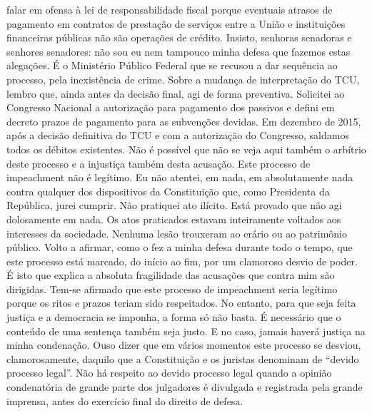 falar em ofensa à lei de responsabilidade fiscal porque eventuais
atrasos de pagamento em contratos de prestação de serviços entre a União
e instituições financeiras públicas não são operações de crédito.
Insisto, senhoras senadoras e senhores senadores: não sou eu nem
tampouco minha defesa que fazemos estas alegações. É o Ministério
Público Federal que se recusou a dar sequência ao processo, pela
inexistência de crime. Sobre a mudança de interpretação do TCU, lembro
que, ainda antes da decisão final, agi de forma preventiva. Solicitei ao
Congresso Nacional a autorização para pagamento dos passivos e defini em
decreto prazos de pagamento para as subvenções devidas. Em dezembro de
2015, após a decisão definitiva do TCU e com a autorização do Congresso,
saldamos todos os débitos existentes. Não é possível que não se veja
aqui também o arbítrio deste processo e a injustiça também desta
acusação. Este processo de impeachment não é legítimo. Eu não atentei,
em nada, em absolutamente nada contra qualquer dos dispositivos da
Constituição que, como Presidenta da República, jurei cumprir. Não
pratiquei ato ilícito. Está provado que não agi dolosamente em nada. Os
atos praticados estavam inteiramente voltados aos interesses da
sociedade. Nenhuma lesão trouxeram ao erário ou ao patrimônio público.
Volto a afirmar, como o fez a minha defesa durante todo o tempo, que
este processo está marcado, do início ao fim, por um clamoroso desvio de
poder. É isto que explica a absoluta fragilidade das acusações que
contra mim são dirigidas. Tem-se afirmado que este processo de
impeachment seria legítimo porque os ritos e prazos teriam sido
respeitados. No entanto, para que seja feita justiça e a democracia se
imponha, a forma só não basta. É necessário que o conteúdo de uma
sentença também seja justo. E no caso, jamais haverá justiça na minha
condenação. Ouso dizer que em vários momentos este processo se desviou,
clamorosamente, daquilo que a Constituição e os juristas denominam de
``devido processo legal''. Não há respeito ao devido processo legal
quando a opinião condenatória de grande parte dos julgadores é divulgada
e registrada pela grande imprensa, antes do exercício final do direito
de defesa.

